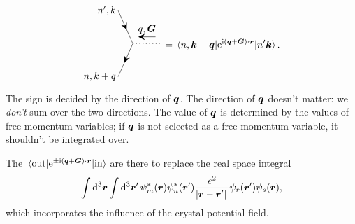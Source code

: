 \documentclass[hyperref, a4paper]{report}
\newcommand*{\ii}{\mathrm{i}}
\newcommand*{\ee}{\mathrm{e}}
\begin{document}
\begin{itemize}
\begin{equation}
\begin{gathered}
\begin{tikzpicture}[x=0.75pt,y=0.75pt,yscale=-1,xscale=1]
                \draw    (45.5,27.33) -- (65.5,72.17) ;
                \draw [shift={(57.05,53.22)}, rotate = 245.96] [fill={rgb, 255:red, 0; green, 0; blue, 0 }  ][line width=0.08]  [draw opacity=0] (8.93,-4.29) -- (0,0) -- (8.93,4.29) -- (5.93,0) -- cycle    ;
                \draw    (65.5,72.17) -- (45.5,117) ;
                \draw [shift={(53.95,98.05)}, rotate = 294.04] [fill={rgb, 255:red, 0; green, 0; blue, 0 }  ][line width=0.08]  [draw opacity=0] (8.93,-4.29) -- (0,0) -- (8.93,4.29) -- (5.93,0) -- cycle    ;
                \draw  [dash pattern={on 0.84pt off 2.51pt}]  (65.5,72.17) -- (105.5,72.17) ;
                \draw    (76,63) -- (96.5,63) ;
                \draw [shift={(73,63)}, rotate = 0] [fill={rgb, 255:red, 0; green, 0; blue, 0 }  ][line width=0.08]  [draw opacity=0] (8.93,-4.29) -- (0,0) -- (8.93,4.29) -- (5.93,0) -- cycle    ;
                
                \draw (84.75,60) node [anchor=south] [inner sep=0.75pt]    {$q, \vb*{G}$};
                \draw (43.5,27.33) node [anchor=east] [inner sep=0.75pt]    {$n', k$};
                \draw (43.5,117) node [anchor=east] [inner sep=0.75pt]    {$n, k+q$};
                \end{tikzpicture}                
        \end{gathered} = 
        \mel{n, \vb*{k} + \vb*{q}}{\ee^{\ii (\vb*{q} + \vb*{G}) \cdot \vb*{r}}}{n' \vb*{k}}.
    \end{equation}
    The sign is decided by the direction of $\vb*{q}$.
    The direction of $\vb*{q}$ doesn't matter:
    we \emph{don't} sum over the two directions.
    The value of $\vb*{q}$ is determined by the values of free momentum variables;
    if $\vb*{q}$ is not selected as a free momentum variable, 
    it shouldn't be integrated over.
\end{itemize}

The $\mel*{\text{out}}{\ee^{\pm \ii (\vb*{q} + \vb*{G}) \cdot \vb*{r}}}{\text{in}}$
are there to replace the real space integral 
\[
    \int \dd[3]{\vb*{r}} \int \dd[3]{\vb*{r}'} 
    \psi_m^*(\vb*{r}) \psi^*_{n}(\vb*{r}')
    \frac{e^2}{\abs*{\vb*{r} - \vb*{r}'}}
    \psi_r(\vb*{r}') \psi_s(\vb*{r}),
\]
which incorporates the influence of the crystal potential field.
\end{document}
